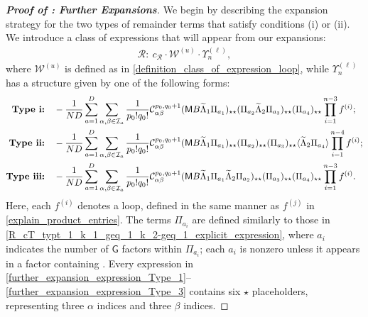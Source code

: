 \documentclass[10pt,reqno]{amsart}
\numberwithin{equation}{section}
\numberwithin{figure}{section}
\newcommand{\rmnum}[1]{\uppercase\expandafter{\romannumeral #1}}
\theoremstyle{plain} %
\theoremstyle{definition} %
\newcommand{\wt}{\widetilde}
\newcommand{\cW}{{\mathcal W}}
\newcommand{\cI}{\mathcal{I}}
\newcommand{\cC}{\mathcal{C}}
\newcommand{\cR}{{\mathcal R}}
\newcommand{\sG}{\mathsf G}
\newcommand{\sM}{\mathsf M}
\newcommand{\p}[1]{({#1})}
\newcommand{\pa}[1]{\left({#1}\right)}
\newcommand{\avg}[1]{\langle #1 \rangle}
\newcommand{\tLambda}{{\wt{\Lambda}}}
\newcommand{\bsum}[3]{\sum_{#1=1}^D\sum_{#2,#3\in \cI_{#1}}}
\newcommand{\iab}{\alpha\beta}
\newcommand{\tl}{\tLambda}
\newcommand{\mm}{\ell}
\numberwithin{equation}{section}
\begin{document}
\begin{proof}[\bf Proof of : Further Expansions]\label{proof_further_expansion}
We begin by describing the expansion strategy for the two types of remainder terms that satisfy conditions (i) or (ii). We introduce a class of expressions that will appear from our expansions:
    \begin{equation}\nonumber
        \begin{aligned}
            \cR:\ c_{\cR}\cdot \cW^{\pa{u}}\cdot \Upsilon_n^{\pa{\mm}},
        \end{aligned}
    \end{equation}
    where $\cW^{\pa{u}}$ is defined as in \eqref{definition_class_of_expression_loop}, while $\Upsilon_n^{\pa{\mm}}$ has a structure given by one of the following forms:
        \begin{align}\label{further_expansion_expression_Type_1}
         \textbf{Type \rmnum{1}:}\quad       &-\frac{1}{ND}\bsum{a}{\alpha}{\beta}\frac{1}{p_0!q_0!}\cC_{\iab}^{p_0,q_0+1}\p{\sM B\tl_1 \Pi_{a_1}}_{\star\star}\p{\Pi_{a_2}\tl_2\Pi_{a_3}}_{\star\star}\p{\Pi_{a_4}}_{\star\star}\prod_{i=1}^{n-3}f^{\pa{i}};\\
         \label{further_expansion_expression_Type_2}
        \textbf{Type \rmnum{2}:}\quad        &-\frac{1}{ND}\bsum{a}{\alpha}{\beta}\frac{1}{p_0!q_0!}\cC_{\iab}^{p_0,q_0+1}\p{\sM B\tl_1 \Pi_{a_1}}_{\star\star}\p{\Pi_{a_2}}_{\star\star}\p{\Pi_{a_3}}_{\star\star}\avg{\tl_2\Pi_{a_4}}\prod_{i=1}^{n-4}f^{\pa{i}};    \\
       \label{further_expansion_expression_Type_3}
         \textbf{Type \rmnum{3}:}\quad       &-\frac{1}{ND}\bsum{a}{\alpha}{\beta}\frac{1}{p_0!q_0!}\cC_{\iab}^{p_0,q_0+1}\p{\sM B\tl_1 \Pi_{a_1}\tl_2\Pi_{a_2}}_{\star\star}\p{\Pi_{a_3}}_{\star\star}\p{\Pi_{a_4}}_{\star\star}\prod_{i=1}^{n-3}f^{\pa{i}}.
            \end{align}
Here, each $f^{(i)}$ denotes a loop, defined in the same manner as $f^{(j)}$ in \eqref{explain_product_entries}. The terms $\Pi_{a_i}$ are defined similarly to those in \eqref{R_cT_typt_1_k_1_geq_1_k_2-geq_1_explicit_expression}, where $a_i$ indicates the number of $\sG$ factors within $\Pi_{a_i}$; each $a_i$ is nonzero unless it appears in a factor containing \smash{$\tl$}. Every expression in \eqref{further_expansion_expression_Type_1}--\eqref{further_expansion_expression_Type_3} contains six $\star$ placeholders, representing three $\alpha$ indices and three $\beta$ indices. %

\end{proof}
\end{document}
